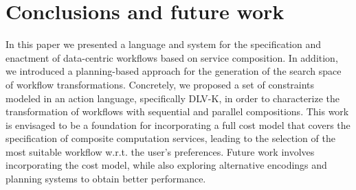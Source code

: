 
\section{Conclusions and future work} \label{sec:conclusion}

In this paper we presented a language and system for the specification and enactment of data-centric workflows based on service composition. In addition, we introduced a planning-based approach for the generation of the search space of workflow transformations. Concretely, we proposed a set of constraints modeled in an action language, specifically DLV-K, in order to characterize the transformation of workflows with sequential and parallel compositions. This work is envisaged to be a foundation for incorporating a full cost model that covers the specification of composite computation services, leading to the selection of the most suitable workflow w.r.t. the user's preferences. Future work involves incorporating the cost model, while also exploring alternative encodings and planning systems to obtain better performance.
